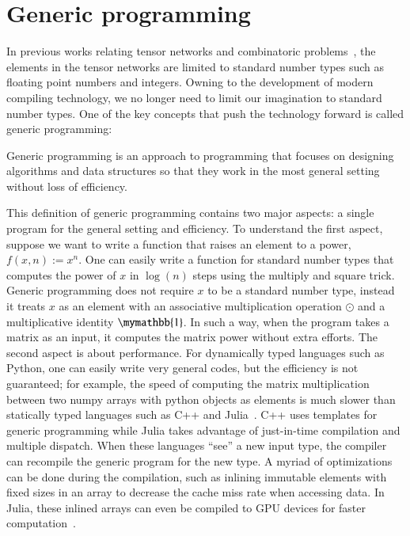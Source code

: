 \documentclass[onefignum, onetabnum]{siamart190516}
\newcommand{\<}{\langle}
\renewcommand{\>}{\rangle}
\newcounter{example}
\begin{document}
\section{Generic programming}\label{sec:generic}
In previous works relating tensor networks and combinatoric problems~\cite{Kourtis2019, Biamonte2017},
the elements in the tensor networks are limited to standard number types such as floating point numbers and integers.
Owning to the development of modern compiling technology, we no longer need to limit our imagination to standard number types.
One of the key concepts that push the technology forward is called generic programming:

\begin{definition}
   Generic programming is an approach to programming that focuses on designing algorithms and data structures so that they work in the most general setting without loss of efficiency. ~\cite{Stepanov2014}
\end{definition}

This definition of generic programming contains two major aspects: a single program for the general setting and efficiency.
To understand the first aspect, suppose we want to write a function that raises an element to a power, $f(x, n) := x^n$.
One can easily write a function for standard number types that computes the power of $x$ in $\log(n)$ steps using the multiply and square trick.
Generic programming does not require $x$ to be a standard number type,
instead it treats $x$ as an element with an associative multiplication operation $\odot$ and a multiplicative identity $\mymathbb{1}$.
In such a way, when the program takes a matrix as an input, it computes the matrix power without extra efforts.
The second aspect is about performance. For dynamically typed languages such as Python,
one can easily write very general codes, but the efficiency is not guaranteed; for example, the speed of computing the matrix multiplication between two numpy arrays with python objects as elements is much slower than statically typed languages such as C++ and Julia~\cite{Bezanson2012}.
C++ uses templates for generic programming while Julia takes advantage of just-in-time compilation and multiple dispatch.
When these languages ``see'' a new input type, the compiler can recompile the generic program for the new type.
A myriad of optimizations can be done during the compilation, such as inlining immutable elements with fixed sizes in an array to decrease the cache miss rate when accessing data.
In Julia, these inlined arrays can even be compiled to GPU devices for faster computation~\cite{Besard2018}.
\end{document}

